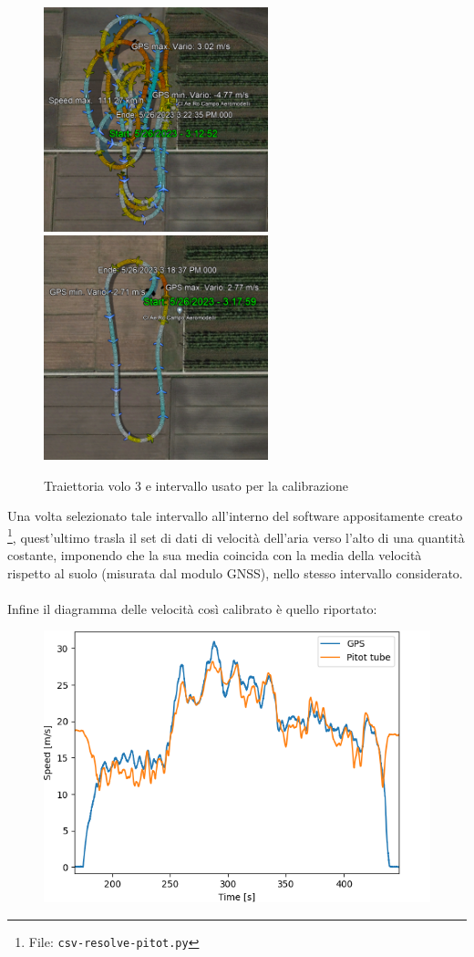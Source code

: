 \documentclass[12pt]{article}
\begin{document}
\begin{figure}[!h]
	\centering
	\includegraphics[width=6.5cm]{img/traiettoria-3}
	\includegraphics[width=6.5cm]{img/traiettoria-isolata-3}
	\captionsetup{labelformat=empty}
	\caption{Traiettoria volo 3 e intervallo usato per la calibrazione}
\end{figure}

\noindent
Una volta selezionato tale intervallo all'interno del software appositamente creato \footnote{File: \texttt{csv-resolve-pitot.py}}, quest'ultimo trasla il set di dati di velocità dell'aria verso l'alto di una quantità costante, imponendo che la sua media coincida con la media della velocità rispetto al suolo (misurata dal modulo GNSS), nello stesso intervallo considerato.
\\\\
Infine il diagramma delle velocità così calibrato è quello riportato:

\begin{figure}[H]
	\centering
	\includegraphics[width=11.5cm]{img/pitot-calibrato-3}
\end{figure}
\end{document}
